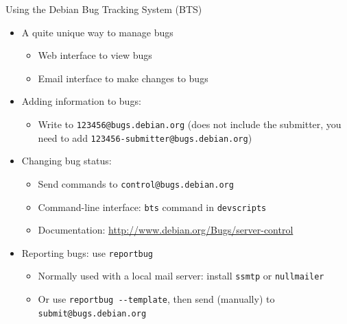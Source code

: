 \documentclass[10pt,final]{beamer}
\begin{document}
\begin{frame}{Using the Debian Bug Tracking System (BTS)}
\begin{itemize}
\item A quite unique way to manage bugs
\begin{itemize}
\item Web interface to view bugs
\item Email interface to make changes to bugs
\end{itemize}
\hbr
\item Adding information to bugs:
	\begin{itemize}
		\item Write to \texttt{123456@bugs.debian.org} (does not include the submitter, you need to add \texttt{123456-submitter@bugs.debian.org})
	\end{itemize}
\hbr
\item Changing bug status:
\begin{itemize}
\item Send commands to \texttt{control@bugs.debian.org}
\item Command-line interface: \texttt{bts} command in \texttt{devscripts}
\item Documentation: \url{http://www.debian.org/Bugs/server-control}
\end{itemize}
\hbr
\item Reporting bugs: use \texttt{reportbug}
\begin{itemize}
\item Normally used with a local mail server: install \texttt{ssmtp} or \texttt{nullmailer}
\item Or use \texttt{reportbug -\@-template}, then send (manually) to \texttt{submit@bugs.debian.org}
\end{itemize}
\end{itemize}
\end{frame}
\end{document}
